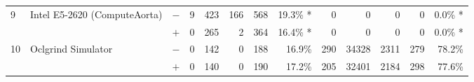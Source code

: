 \begin{tabular}{lll | rrrrr | rrrrr }
\hline
\multirow{ 2}{*}{9} & \multirow{ 2}{*}{Intel E5-2620 (ComputeAorta)} & $-$ & 9 & 423 & 166 & 568 & 19.3\% *       & 0 & 0 & 0 & 0 & 0.0\% * \\& & $+$ & 0 & 265 & 2 & 364 & 16.4\% * & 0 & 0 & 0 & 0 & 0.0\% * \\
\hline
\multirow{ 2}{*}{10} & \multirow{ 2}{*}{Oclgrind Simulator} & $-$ & 0 & 142 & 0 & 188 & 16.9\%       & 290 & 34328 & 2311 & 279 & 78.2\% \\& & $+$ & 0 & 140 & 0 & 190 & 17.2\% & 205 & 32401 & 2184 & 298 & 77.6\% \\
  \bottomrule
\end{tabular}

